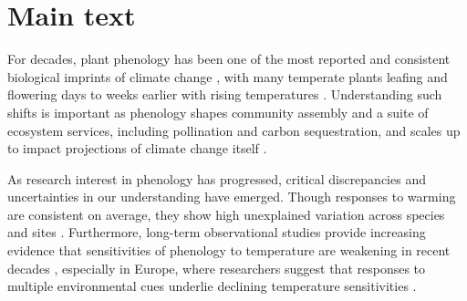 \documentclass{article}
\begin{document}


\section* {Main text}

\par For decades, plant phenology has been one of the most reported and consistent biological imprints of climate change \citep{IPCC:2014sm}, with many temperate plants leafing and flowering days to weeks earlier with rising temperatures \citep{millerrushing2008,menzel2006}. Understanding such shifts is important as phenology shapes community assembly and a suite of ecosystem services, including pollination and carbon sequestration, and scales up to impact projections of climate change itself \cite{Cleland:2007or}.

\par As research interest in phenology has progressed, critical discrepancies and uncertainties in our understanding have emerged. Though responses to warming are consistent on average, they show high unexplained variation across species and sites \citep{Wolkovich:2012n}. Furthermore, long-term observational studies provide increasing evidence that sensitivities of phenology to temperature are weakening in recent decades \citep{Rutishauser:2008,yu2010}, especially in Europe, where researchers suggest that responses to multiple environmental cues underlie declining temperature sensitivities \citep{fu2015}.
\end{document}
